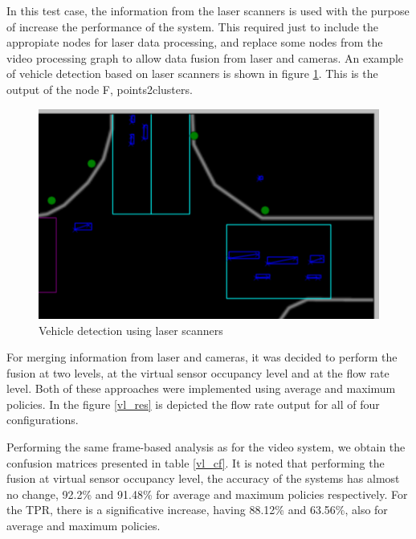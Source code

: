 
In this test case, the information from the laser scanners is used with the purpose of increase the performance of the system. This required just to include the appropiate nodes for laser data processing, and replace some nodes from the video processing graph to allow data fusion from laser and cameras. An example of vehicle detection based on laser scanners is shown in figure \ref{laser_detection}. This is the output of the node F, points2clusters.

\begin{figure}[htb!]
\centering
\includegraphics[scale=0.4]{fig/4/laser1a.png}
\caption{Vehicle detection using laser scanners}
\label{laser_detection}
\end{figure}

For merging information from laser and cameras, it was decided to perform the fusion at two levels, at the virtual sensor occupancy level and at the flow rate level. Both of these approaches were implemented using average and maximum policies. In the figure \ref{vl_res} is depicted the flow rate output for all of four configurations.

Performing the same frame-based analysis as for the video system, we obtain the confusion matrices presented in table \ref{vl_cf}. It is noted that performing the fusion at virtual sensor occupancy level, the accuracy of the systems has almost no change, 92.2\% and 91.48\% for average and maximum policies respectively. For the TPR, there is a significative increase, having 88.12\% and 63.56\%, also for average and maximum policies.

